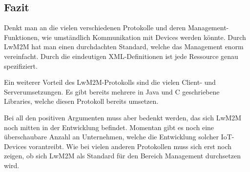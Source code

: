 \subsection{Fazit}
Denkt man an die vielen verschiedenen Protokolle und deren Management-Funktionen, wie umständlich Kommunikation mit Devices werden könnte. Durch LwM2M hat man einen durchdachten Standard, welche das Management enorm vereinfacht. Durch die eindeutigen XML-Definitionen ist jede Ressource genau spezifiziert.

Ein weiterer Vorteil des LwM2M-Protokolls sind die vielen Client- und Serverumsetzungen. Es gibt bereits mehrere in Java und C geschriebene Libraries, welche diesen Protokoll bereits umsetzen.

Bei all den positiven Argumenten muss aber bedenkt werden, das sich LwM2M noch mitten in der Entwicklung befindet. Momentan gibt es noch eine überschaubare Anzahl an Unternehmen, welche die Entwicklung solcher IoT-Devices vorantreibt. Wie bei vielen anderen Protokollen muss sich erst noch zeigen, ob sich LwM2M als Standard für den Bereich Management durchsetzen wird.

